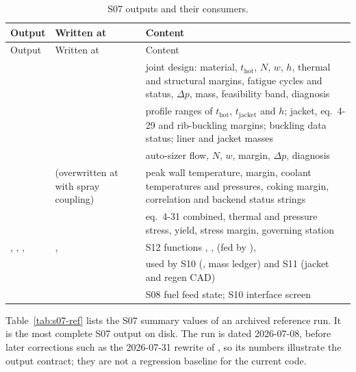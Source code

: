 {\footnotesize
\begin{longtable}{P{3.8cm}P{2.9cm}P{9.0cm}}
\caption{S07 outputs and their consumers.}\label{tab:s07-out}\\
\toprule
Output & Written at & Content\\
\midrule
\endfirsthead
\toprule
Output & Written at & Content\\
\midrule
\endhead
{} &  & joint design: material, $t_{\mathrm{hot}}$, $N$, $w$, $h$, thermal and structural margins, fatigue cycles and status, $\Delta p$, mass, feasibility band, diagnosis\\
 &  & profile ranges of $t_{\mathrm{hot}}$, $t_{\mathrm{jacket}}$ and $h$; jacket, eq.\ 4-29 and rib-buckling margins; buckling data status; liner and jacket masses\\
 &  & auto-sizer flow, $N$, $w$, margin, $\Delta p$, diagnosis\\
 &  (overwritten at  with spray coupling) & peak wall temperature, margin, coolant temperatures and pressures, coking margin, correlation and backend status strings\\
 &  & eq.\ 4-31 combined, thermal and pressure stress, yield, stress margin, governing station\\
, , ,  & ,  & S12 functions , ,  (fed by ), \\
 &  & used by S10 (, mass ledger) and S11 (jacket and regen CAD)\\
 &  & S08 fuel feed state; S10 interface screen\\
\bottomrule
\end{longtable}
}

Table~\ref{tab:s07-ref} lists the S07 summary values of an archived reference run. It is the most complete S07 output on disk. The run is dated 2026-07-08, before later corrections such as the 2026-07-31 rewrite of , so its numbers illustrate the output contract; they are not a regression baseline for the current code.

